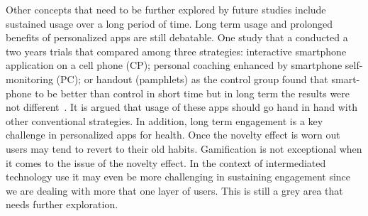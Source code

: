 Other concepts that need to be further explored by future studies include sustained usage over a long period of time. Long term usage and prolonged benefits of personalized apps are still debatable. One study that a conducted a two years trials that compared among three strategies: interactive smartphone application on a cell phone (CP); personal coaching enhanced by smartphone self-monitoring (PC); or handout (pamphlets) as the control group found that smart-phone to be better than control in short time but in long term the results were not different~\citep{svetkey2015cell}. It is argued that usage of these apps should go hand in hand with other conventional strategies. In addition,  long  term engagement is a key challenge in personalized apps for health. Once the novelty effect is worn out users may tend to revert to their old habits. Gamification is not exceptional when it comes to the issue of the novelty effect. In the context of intermediated technology use it may even be more challenging in sustaining engagement since we are dealing with more that one layer of users. This is still a grey area that needs further exploration.
\begin{flushright}
\end{flushright}
